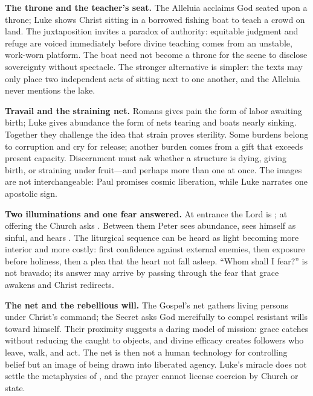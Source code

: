 \begin{deepstudy}
\noindent\textbf{The throne and the teacher's seat.\enspace{}}
The Alleluia acclaims God seated upon a throne; Luke shows Christ sitting in a borrowed fishing boat to teach a crowd on land. The juxtaposition invites a paradox of authority: equitable judgment and refuge are voiced immediately before divine teaching comes from an unstable, work-worn platform. The boat need not become a throne for the scene to disclose sovereignty without spectacle. The stronger alternative is simpler: the texts may only place two independent acts of sitting next to one another, and the Alleluia never mentions the lake.

\noindent\textbf{Travail and the straining net.\enspace{}}
Romans gives pain the form of labor awaiting birth; Luke gives abundance the form of nets tearing and boats nearly sinking. Together they challenge the idea that strain proves sterility. Some burdens belong to corruption and cry for release; another burden comes from a gift that exceeds present capacity. Discernment must ask whether a structure is dying, giving birth, or straining under fruit---and perhaps more than one at once. The images are not interchangeable: Paul promises cosmic liberation, while Luke narrates one apostolic sign.

\noindent\textbf{Two illuminations and one fear answered.\enspace{}}
At entrance the Lord is ; at offering the Church asks . Between them Peter sees abundance, sees himself as sinful, and hears . The liturgical sequence can be heard as light becoming more interior and more costly: first confidence against external enemies, then exposure before holiness, then a plea that the heart not fall asleep. ``Whom shall I fear?'' is not bravado; its answer may arrive by passing through the fear that grace awakens and Christ redirects.

\noindent\textbf{The net and the rebellious will.\enspace{}}
The Gospel's net gathers living persons under Christ's command; the Secret asks God mercifully to compel resistant wills toward himself. Their proximity suggests a daring model of mission: grace catches without reducing the caught to objects, and divine efficacy creates followers who leave, walk, and act. The net is then not a human technology for controlling belief but an image of being drawn into liberated agency. Luke's miracle does not settle the metaphysics of , and the prayer cannot license coercion by Church or state.


\end{deepstudy}
